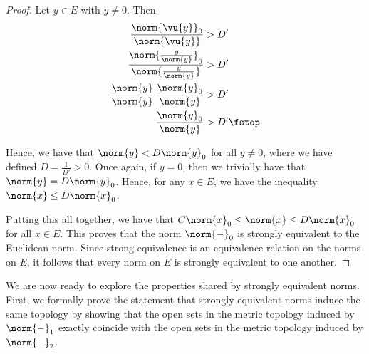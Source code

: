 \begin{proof}
   \vspace{3mm}

   Let \( y\in E \) with \( y\neq 0 \). Then
   \begin{align*}
     \frac{\norm{\vu{y}}_0}{\norm{\vu{y}}}&>D'\\
     \frac{\norm{\frac{y}{\norm{y}}}_0}{\norm{\frac{y}{\norm{y}}}}&>D'\\
     \frac{\norm{y}}{\norm{y}}\,\frac{\norm{y}_0}{\norm{y}}&>D'\\
     \frac{\norm{y}_0}{\norm{y}}&>D'\fstop
   \end{align*}

   Hence, we have that \( \norm{y}<D\norm{y}_0 \) for all \( y\neq 0 \), where we have defined \( D=\frac{1}{D'}>0 \). Once again, if \( y=0 \), then we trivially have that \( \norm{y}=D\norm{y}_0 \). Hence, for any \( x\in E \), we have the inequality \( \norm{x}\leq D\norm{x}_0 \).

   \vspace{3mm}

   Putting this all together, we have that \( C\norm{x}_0\leq \norm{x}\leq D\norm{x}_0 \) for all \( x\in E \). This proves that the norm \( \norm{-}_0 \) is strongly equivalent to the Euclidean norm. Since strong equivalence is an equivalence relation on the norms on \( E \), it follows that every norm on \( E \) is strongly equivalent to one another.
 \end{proof}

 We are now ready to explore the properties shared by strongly equivalent norms. First, we formally prove the statement that strongly equivalent norms induce the same topology by showing that the open sets in the metric topology induced by \( \norm{-}_1 \) exactly coincide with the open sets in the metric topology induced by \( \norm{-}_2 \).

